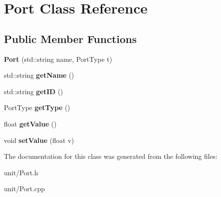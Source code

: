 \hypertarget{classPort}{}\section{Port Class Reference}
\label{classPort}
\subsection*{Public Member Functions}
\begin{DoxyCompactItemize}
\item 
{\bfseries Port} (std\+::string name, Port\+Type t)\hypertarget{classPort_aadff8efe873e31b3362dda2b4a28c8c9}{}\label{classPort_aadff8efe873e31b3362dda2b4a28c8c9}

\item 
std\+::string {\bfseries get\+Name} ()\hypertarget{classPort_ad2c3baf0b291aee3b5b65178231754a6}{}\label{classPort_ad2c3baf0b291aee3b5b65178231754a6}

\item 
std\+::string {\bfseries get\+ID} ()\hypertarget{classPort_a31744528a5ade68a59ce094f3797bc1e}{}\label{classPort_a31744528a5ade68a59ce094f3797bc1e}

\item 
Port\+Type {\bfseries get\+Type} ()\hypertarget{classPort_a5859f5d788d56c0103f4274b6d62b725}{}\label{classPort_a5859f5d788d56c0103f4274b6d62b725}

\item 
float {\bfseries get\+Value} ()\hypertarget{classPort_a101b9cfba62777fb61c35a642b63f25a}{}\label{classPort_a101b9cfba62777fb61c35a642b63f25a}

\item 
void {\bfseries set\+Value} (float v)\hypertarget{classPort_afc93a217ba756e559c157b66745823a7}{}\label{classPort_afc93a217ba756e559c157b66745823a7}

\end{DoxyCompactItemize}


The documentation for this class was generated from the following files\+:\begin{DoxyCompactItemize}
\item 
unit/Port.\+h\item 
unit/Port.\+cpp\end{DoxyCompactItemize}
